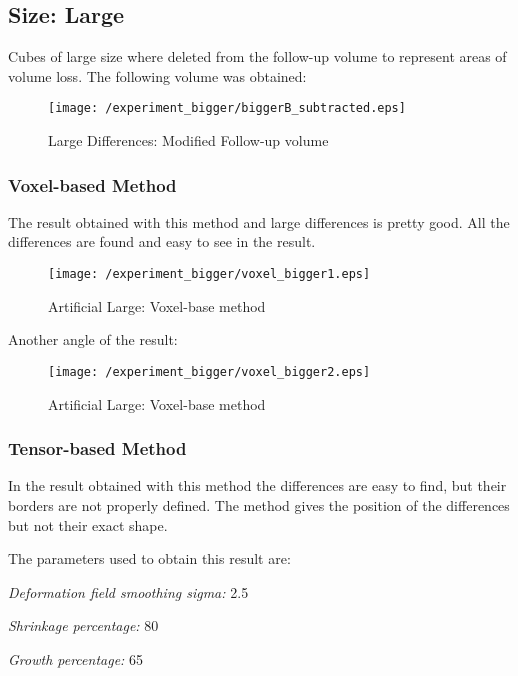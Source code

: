 \subsection{Size: Large}
Cubes of large size where deleted from the follow-up volume to
represent areas of volume loss. The following volume was obtained:

\begin{figure}[H]
  \centering
  \texttt{[image: /experiment\_bigger/biggerB\_subtracted.eps]}
  \caption{Large Differences: Modified Follow-up volume}
  \label{largeB}
\end{figure}

\subsubsection{Voxel-based Method}
The result obtained with this method and large differences is pretty
good. All the differences are found and easy to see in the result.

\begin{figure}[H]
  \centering
  \texttt{[image: /experiment\_bigger/voxel\_bigger1.eps]}
  \caption{Artificial Large: Voxel-base method}
  \label{voxel_large1}
\end{figure}

Another angle of the result:

\begin{figure}[H]
  \centering
  \texttt{[image: /experiment\_bigger/voxel\_bigger2.eps]}
  \caption{Artificial Large: Voxel-base method}
  \label{voxel_large2}
\end{figure}

\subsubsection{Tensor-based Method}
In the result obtained with this method the differences are easy to
find, but their borders are not properly defined. The method gives the
position of the differences but not their exact shape.

The parameters used to obtain this result are:
\begin{description}
\item \textit{Deformation field smoothing sigma:} 2.5
\item \textit{Shrinkage percentage:} 80
\item \textit{Growth percentage:} 65
\end{description}

